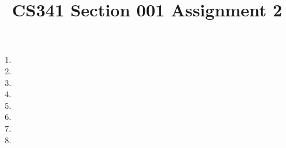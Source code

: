 \documentclass[12pt]{article}
\title{CS341 Section 001 Assignment 2}
\begin{document}
\maketitle

\begin{enumerate}
\item
\item
\item
\item
\item
\item
\item
\item
\end{enumerate}
\end{document}
